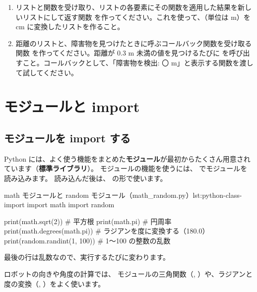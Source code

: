 \begin{exercise}
\begin{enumerate}
  \item リストと関数を受け取り、リストの各要素にその関数を適用した結果を新しいリストにして返す関数  を作ってください。これを使って、\cmd{[1.0, 2.5, 4.0]}（単位は m）を cm に変換したリストを作ること。
  \item 距離のリストと、障害物を見つけたときに呼ぶコールバック関数を受け取る関数  を作ってください。距離が 0.3 m 未満の値を見つけるたびに  を呼び出すこと。コールバックとして、「障害物を検出: 〇 m」と表示する関数を渡して試してください。
\end{enumerate}
\end{exercise}

\section{モジュールと import}
\label{sec:python-class-module}

\subsection{モジュールを import する}

Python には、よく使う機能をまとめた\textbf{モジュール}が最初からたくさん用意されています（\textbf{標準ライブラリ}）。
モジュールの機能を使うには、 でモジュールを読み込みます。
読み込んだ後は、 の形で使います。

\begin{codelisting}[style=python]{math モジュールと random モジュール（math\_random.py）}{lst:python-class-import}
import math
import random

print(math.sqrt(2))              # 平方根
print(math.pi)                   # 円周率
print(math.degrees(math.pi))     # ラジアンを度に変換する（180.0）
print(random.randint(1, 100))    # 1〜100 の整数の乱数
\end{codelisting}


最後の行は乱数なので、実行するたびに変わります。

ロボットの向きや角度の計算では、 モジュールの三角関数（, ）や、ラジアンと度の変換（, ）をよく使います。

